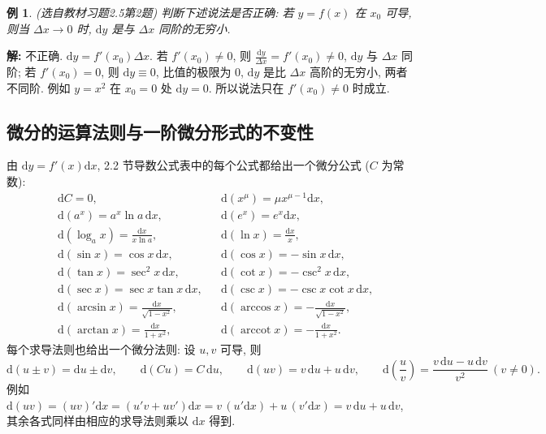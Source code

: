 \documentclass[UTF8,openany]{ctexbook}
\theoremstyle{chinesetextbook}
\newtheorem{example}{例}[section]
\newenvironment{cnsolution}{\par\indent\textbf{解:} \ignorespaces}{\par}
\newcommand{\dd}{\mathrm d}
\begin{document}
\begin{example}\label{ex:c2-h5-2}
\textnormal{(选自教材习题2.5第2题)} 判断下述说法是否正确: 若 $y=f(x)$ 在 $x_0$ 可导, 则当 $\Delta x\to0$ 时, $\dd y$ 是与 $\Delta x$ 同阶的无穷小.
\end{example}
\begin{cnsolution}
不正确. $\dd y=f'(x_0)\Delta x$. 若 $f'(x_0)\ne0$, 则 $\displaystyle\frac{\dd y}{\Delta x}=f'(x_0)\ne0$, $\dd y$ 与 $\Delta x$ 同阶; 若 $f'(x_0)=0$, 则 $\dd y\equiv0$, 比值的极限为 $0$, $\dd y$ 是比 $\Delta x$ 高阶的无穷小, 两者不同阶. 例如 $y=x^2$ 在 $x_0=0$ 处 $\dd y=0$. 所以说法只在 $f'(x_0)\ne0$ 时成立.
\end{cnsolution}
\subsection{微分的运算法则与一阶微分形式的不变性}
由 $\dd y=f'(x)\dd x$, 2.2 节导数公式表中的每个公式都给出一个微分公式 ($C$ 为常数):
\[
\begin{aligned}
&\dd C=0, &&\dd(x^\mu)=\mu x^{\mu-1}\dd x,\\
&\dd(a^x)=a^x\ln a\,\dd x, &&\dd(e^x)=e^x\dd x,\\
&\dd(\log_ax)=\frac{\dd x}{x\ln a}, &&\dd(\ln x)=\frac{\dd x}x,\\
&\dd(\sin x)=\cos x\,\dd x, &&\dd(\cos x)=-\sin x\,\dd x,\\
&\dd(\tan x)=\sec^2x\,\dd x, &&\dd(\cot x)=-\csc^2x\,\dd x,\\
&\dd(\sec x)=\sec x\tan x\,\dd x, &&\dd(\csc x)=-\csc x\cot x\,\dd x,\\
&\dd(\arcsin x)=\frac{\dd x}{\sqrt{1-x^2}}, &&\dd(\arccos x)=-\frac{\dd x}{\sqrt{1-x^2}},\\
&\dd(\arctan x)=\frac{\dd x}{1+x^2},\qquad &&\dd(\operatorname{arccot}x)=-\frac{\dd x}{1+x^2}.
\end{aligned}
\]
每个求导法则也给出一个微分法则: 设 $u,v$ 可导, 则
\[
\dd(u\pm v)=\dd u\pm\dd v,\qquad\dd(Cu)=C\,\dd u,\qquad\dd(uv)=v\,\dd u+u\,\dd v,\qquad\dd\left(\frac uv\right)=\frac{v\,\dd u-u\,\dd v}{v^2}\ (v\ne0).
\]
例如 $\dd(uv)=(uv)'\dd x=(u'v+uv')\dd x=v\,(u'\dd x)+u\,(v'\dd x)=v\,\dd u+u\,\dd v$, 其余各式同样由相应的求导法则乘以 $\dd x$ 得到.
\end{document}

